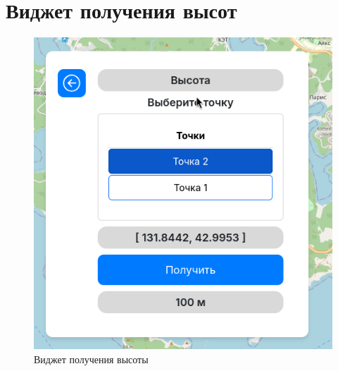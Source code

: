 \chapter{Виджет получения высот}
\label{cha:elev}

\begin{figure}[h]  %
	\centering
	\includegraphics[height=1\textwidth]{imgs/elevation.png}  %
	\caption{Виджет получения высоты}  %
	\label{fig:elev}  %
\end{figure}